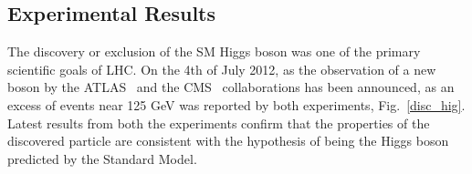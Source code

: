 \subsection*{Experimental Results}
The discovery or exclusion of the SM Higgs boson was one of the primary scientific goals of LHC. On the 4th of July 2012, as the observation of a new boson by the ATLAS~\cite{Aad:2012tfa} and the CMS~\cite{Chatrchyan:2012xdj} collaborations has been announced, as an excess of events near 125 GeV was reported by both experiments, Fig.~\ref{disc_hig}. 
Latest results from both the experiments confirm that  the properties of the discovered particle are consistent with the hypothesis of
being the Higgs boson predicted by the Standard Model.

